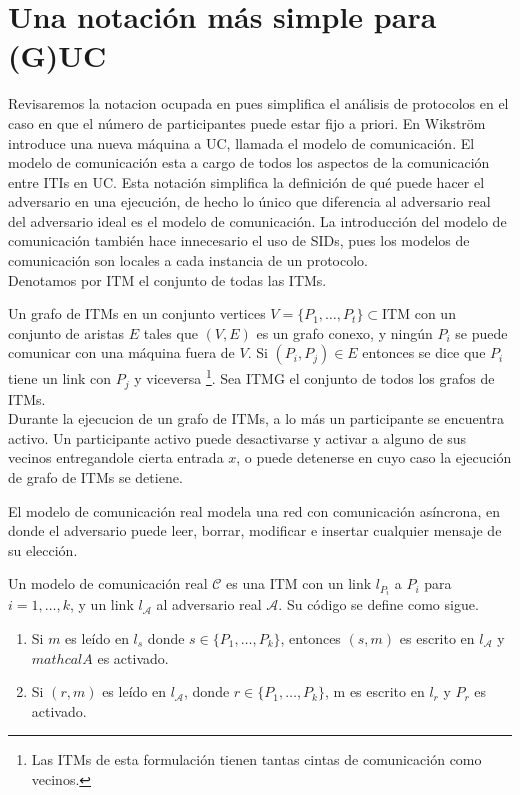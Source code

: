 \section{Una notación más simple para (G)UC}
Revisaremos la notacion ocupada en \cite{mnCompleto} pues simplifica el análisis de protocolos en el caso
en que el número de participantes puede estar fijo a priori. En \cite{mnCompleto} Wikstr\"om introduce una
nueva máquina a UC, llamada el modelo de comunicación. El modelo de comunicación esta a cargo de todos los
aspectos de la comunicación entre ITIs en UC. Esta notación simplifica la definición de qué puede hacer el
adversario en una ejecución, de hecho lo único que diferencia al adversario real del adversario 
ideal es el modelo de comunicación. La introducción del modelo de comunicación también hace innecesario
el uso de SIDs, pues los modelos de comunicación son locales a cada instancia de un protocolo.\\
Denotamos por $\textrm{ITM}$ el conjunto de todas las ITMs.

\begin{definicion}
Un grafo de ITMs en un conjunto vertices $V = \{P_1, \ldots, P_t\} \subset \textrm{ITM}$ con un conjunto
de aristas $E$ tales que $(V, E)$ es un grafo conexo, y ningún $P_i$ se puede comunicar con una máquina
fuera de $V$. Si $(P_i, P_j)\in E$ entonces se dice que $P_i$ tiene un link con $P_j$ y viceversa
\footnote{Las ITMs de esta formulación tienen tantas cintas de comunicación como vecinos.}.
Sea ITMG el conjunto de todos los grafos de ITMs.\\
Durante la ejecucion de un grafo de ITMs, a lo más un participante se encuentra activo. Un participante
activo puede desactivarse y activar a alguno de sus vecinos entregandole cierta entrada $x$, o puede
detenerse en cuyo caso la ejecución de grafo de ITMs se detiene.
\end{definicion}

El modelo de comunicación real modela una red con comunicación asíncrona, en donde el adversario
puede leer, borrar, modificar e insertar cualquier mensaje de su elección.

\begin{definicion}
Un modelo de comunicación real $\mathcal{C}$ es una ITM con un link $l_{P_i}$ a $P_i$
para $i = 1, \ldots, k$, y un link $l_\mathcal{A}$ al adversario real $\mathcal{A}$.
Su código se define como sigue.
\begin{enumerate}
  \item Si $m$ es leído en $l_s$ donde $s \in \{P_1, \ldots, P_k\}$, entonces $(s, m)$ es
        escrito en $l_\mathcal{A}$ y $mathcal{A}$ es activado.
  \item Si $(r, m)$ es leído en $l_\mathcal{A}$, donde $r \in \{P_1, \ldots, P_k\}$,
        m es escrito en $l_r$ y $P_r$ es activado.
\end{enumerate}
\end{definicion}

